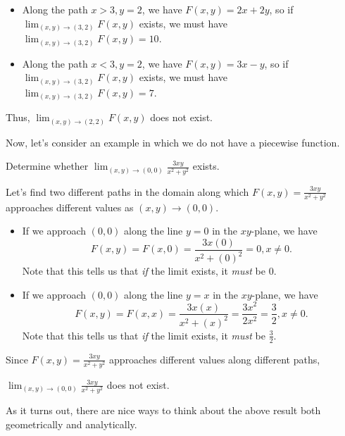\documentclass{ximera}
\newcommand{\point}[1]{\left(#1\right)} %
\newcommand{\Lim}[2]{\lim_{#1 \to #2}}
\begin{document}
\begin{example}
\begin{example}
\begin{explanation}
\begin{itemize}
\item Along the path $x>3, y=2$, we have $F(x,y) = 2x+2y$, so if $\Lim{\point{x,y}}{\point{3,2}} F(x,y)$ exists, we must have $\Lim{\point{x,y}}{\point{3,2}} F(x,y) = 10$.
\item Along the path $x<3, y=2$, we have $F(x,y) = 3x-y$, so if $\Lim{\point{x,y}}{\point{3,2}} F(x,y)$ exists, we must have $\Lim{\point{x,y}}{\point{3,2}} F(x,y) = 7$.
\end{itemize}
Thus, $\Lim{\point{x,y}}{\point{2,2}} F(x,y)$ does not exist.
\end{explanation}
\end{example}
\end{example}

Now, let's consider an example in which we do not have a piecewise function.

\begin{example}
  Determine whether $\lim_{\point{x,y}\to\point{0,0}} \frac{3xy}{x^2+y^2}$ exists.
  
  \begin{explanation}
  Let's find two different paths in the domain along which $F(x,y)=\frac{3xy}{x^2+y^2}$ approaches different values as $\point{x,y} \to \point{0,0}$.
  
  \begin{itemize}
  \item If we approach $\point{0,0}$ along the line $y=0$ in the $xy$-plane, we have 
    \[
  F(x,y) = F(x,0) =  \frac{3x(0)}{x^2+(0)^2} = 0, x \neq 0.
  \]
  Note that this tells us that \emph{if} the limit exists, it \emph{must} be $0$.
  
 \item If we approach $\point{0,0}$ along the line $y=x$ in the $xy$-plane, we have 
   \[
  F(x,y) = F(x,x) =  \frac{3x(x)}{x^2+(x)^2} = \frac{3x^2}{2x^2} = \frac{3}{2}, x \neq 0.
  \]
  Note that this tells us that \emph{if} the limit exists, it \emph{must} be $\frac{3}{2}$.
  
 \end{itemize}
 
 Since $F(x,y)=\frac{3xy}{x^2+y^2}$ approaches different values along different paths,
 
  $\lim_{\point{x,y}\to\point{0,0}} \frac{3xy}{x^2+y^2}$ does not exist.
 \end{explanation}
 \end{example}
 
 As it turns out, there are nice ways to think about the above result both geometrically and analytically.
 
\end{document}
